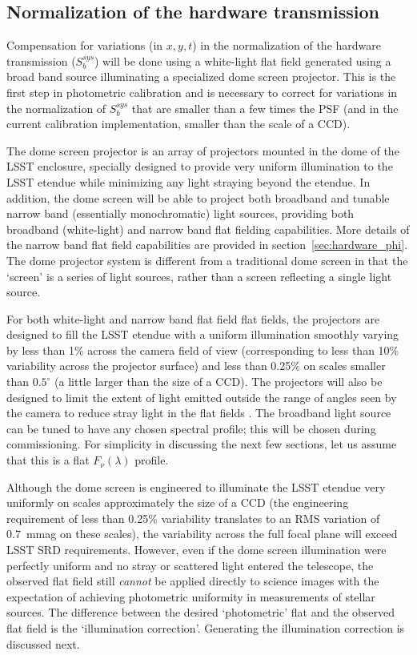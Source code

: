 \documentclass[12pt,preprint]{aastex}
\begin{document}
\subsection{Normalization of the hardware transmission}
\label{sec:hardware_norm}

Compensation for variations (in $x,y,t$) in the normalization of the
hardware transmission ($S_b^{sys}$) will be done using a white-light
flat field generated using a broad band source illuminating a
specialized dome screen projector. This is the first step in
photometric calibration and is necessary to correct for variations in
the normalization of $S_b^{sys}$ that are smaller than a few times the
PSF (and in the current calibration implementation, smaller than the
scale of a CCD).

The dome screen projector is an array of projectors mounted in the
dome of the LSST enclosure, specially designed to provide very uniform
illumination to the LSST etendue while minimizing any light straying
beyond the etendue. In addition, the dome screen will be able to
project both broadband and tunable narrow band (essentially
monochromatic) light sources, providing both broadband (white-light)
and narrow band flat fielding capabilities.  More details of the
narrow band flat field capabilities are provided in
section~\ref{sec:hardware_phi}. The dome projector system is different from a
traditional dome screen in that the `screen' is a series of light sources,
rather than a screen reflecting a single light source. 

For both white-light and narrow band flat field flat fields, the
projectors are designed to fill the LSST etendue with a uniform
illumination smoothly varying by less than 1\% across the camera field
of view (corresponding to less than 10\% variability across the
projector surface) and less than 0.25\% on scales smaller than
$0.5^{\circ}$ (a little larger than the size of a CCD). The projectors
will also be designed to limit the extent of light emitted outside the
range of angles seen by the camera to reduce stray light in the flat
fields \citep{Gressler2010}. The broadband light source can be tuned
to have any chosen spectral profile; this will be chosen during
commissioning. For simplicity in discussing the next few sections, let
us assume that this is a flat $F_\nu(\lambda)$ profile.

Although the dome screen is engineered to illuminate the LSST etendue
very uniformly on scales approximately the size of a CCD (the
engineering requirement of less than 0.25\% variability translates to
an RMS variation of 0.7~mmag on these scales), the variability across
the full focal plane will exceed LSST SRD requirements. However, even
if the dome screen illumination were perfectly uniform and no stray or
scattered light entered the telescope, the observed flat field still
{\it cannot} be applied directly to science images with the
expectation of achieving photometric uniformity in measurements of
stellar sources. The difference between the desired `photometric' flat
and the observed flat field is the `illumination
correction'. Generating the illumination correction is discussed next. 
\end{document}
